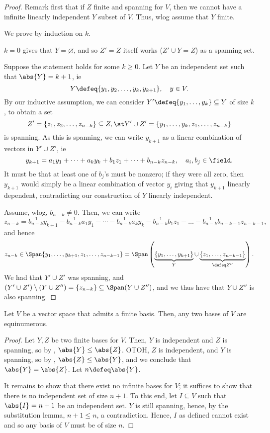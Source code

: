 \begin{proof}
    Remark first that if $Z$ finite and spanning for $V$, then we cannot have a infinite linearly independent $Y$ subset of $V$. Thus, wlog assume that $Y$ finite.
    
    We prove by induction on $k$.

    $k = 0$ gives that $Y = \varnothing$, and so $Z' = Z$ itself works ($Z' \cup Y = Z$) as a spanning set.

    Suppose the statement holds for some $k \geq 0$. Let $Y$ be an independent set such that $\abs{Y} = k + 1$, ie \[
    Y \defeq \{y_1, y_2, \dots, y_k, y_{k+1}\}, \quad y \in V.
    \]
    By our inductive assumption, we can consider $Y' \defeq \{y_1, \dots, y_k\} \subseteq Y$ of size $k$, to obtain a set \[
    Z' = \{z_1, z_2, \dots, z_{n-k}\} \subseteq Z, \st Y' \cup Z' = \{y_1, \dots, y_k, z_1, \dots, z_{n-k}\}
    \]
    is spanning. As this is spanning, we can write $y_{k+1}$ as a linear combination of vectors in $Y' \cup Z'$, ie \[
    y_{k+1} = a_1 y_1 + \dots + a_k y_k + b_1 z_1 + \dots + b_{n-k} z_{n-k}, \quad a_i, b_j \in \field.
    \]
    It must be that at least one of $b_j$'s must be nonzero; if they were all zero, then $y_{k+1}$ would simply be a linear combination of vector $y_i$ giving that $y_{k+1}$ linearly dependent, contradicting our construction of $Y$ linearly independent.

    Assume, wlog, $b_{n-k} \neq 0$. Then, we can write \[
    z_{n-k} = b_{n-k}^{-1}y_{k+1}-b_{n-k}^{-1}a_1y_{1}-\cdots - b_{n-k}^{-1}a_ky_k - b_{n-k}^{-1}b_1 z_1 - \dots - b_{n-k}^{-1}b_{n-k-1}z_{n-k-1},    
    \]
    and hence $$z_{n-k} \in \Span \{y_1, \dots, y_{k+1}, z_1, \dots, z_{n-k-1}\} = \Span \left(\underbrace{\{y_1, \dots, y_{k+1}\}}_{Y} \cup \underbrace{\{z_1, \dots, z_{n-k-1}\}}_{\defeq Z''} \right).$$
    We had that $Y' \cup Z'$ was spanning, and $(Y' \cup Z') \setminus (Y \cup Z'') = \{z_{n-k}\} \subseteq \Span (Y \cup Z'')$, and we thus have that $Y \cup Z''$ is also spanning.
\end{proof}

\begin{corollary}
    Let $V$ be a vector space that admits a finite basis. Then, any two bases of $V$ are equinumerous.
\end{corollary}

\begin{proof}
    Let $Y, Z$ be two finite bases for $V$. Then, $Y$ is independent and $Z$ is spanning, so by , $\abs{Y} \leq \abs{Z}$. OTOH, $Z$ is independent, and $Y$ is spanning, so by , $\abs{Z} \leq \abs{Y}$, and we conclude that $\abs{Y} = \abs{Z}$. Let $n \defeq \abs{Y}$.

    It remains to show that there exist no infinite bases for $V$; it suffices to show that there is no independent set of size $n+1$. To this end, let $I \subseteq V$ such that $\abs{I} = n+1$ be an independent set. $Y$ is still spanning, hence, by the substitution lemma, $n + 1 \leq n$, a contradiction. Hence, $I$ as defined cannot exist and so any basis of $V$ must be of size $n$.
\end{proof}

